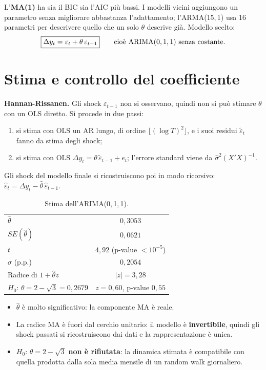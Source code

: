 \documentclass[11pt,a4paper]{article}
\begin{document}
L'\textbf{MA(1)} ha sia il BIC sia l'AIC più bassi. I modelli vicini aggiungono un parametro senza migliorare abbastanza l'adattamento; l'ARMA(15,\,1) usa 16 parametri per descrivere quello che un solo $\theta$ descrive già. Modello scelto:
\[
\boxed{\Delta y_t = \varepsilon_t + \theta\,\varepsilon_{t-1}} \qquad \text{cioè ARIMA(0,\,1,\,1) senza costante.}
\]

\section{Stima e controllo del coefficiente}

\textbf{Hannan-Rissanen.} Gli shock $\varepsilon_{t-1}$ non si osservano, quindi non si può stimare $\theta$ con un OLS diretto. Si procede in due passi:
\begin{enumerate}
\item si stima con OLS un AR lungo, di ordine $\lfloor(\log T)^2\rfloor$, e i suoi residui $\tilde\varepsilon_t$ fanno da stima degli shock;
\item si stima con OLS $\Delta y_t = \theta\,\tilde\varepsilon_{t-1} + e_t$; l'errore standard viene da $\hat\sigma^2(X'X)^{-1}$.
\end{enumerate}
Gli shock del modello finale si ricostruiscono poi in modo ricorsivo: $\hat\varepsilon_t = \Delta y_t - \hat\theta\,\hat\varepsilon_{t-1}$.

\begin{table}[H]
\centering
\begin{tabular}{lc}
\toprule
$\hat\theta$ & $0{,}3053$ \\
$SE(\hat\theta)$ & $0{,}0621$ \\
$t$ & $4{,}92$ \quad (p-value $< 10^{-5}$) \\
$\hat\sigma$ (p.p.) & $0{,}2054$ \\
Radice di $1 + \hat\theta z$ & $|z| = 3{,}28$ \\
\midrule
$H_0$: $\theta = 2 - \sqrt3 = 0{,}2679$ & $z = 0{,}60$, p-value $0{,}55$ \\
\bottomrule
\end{tabular}
\caption{Stima dell'ARIMA(0,\,1,\,1).}
\end{table}

\begin{itemize}
\item $\hat\theta$ è molto significativo: la componente MA è reale.
\item La radice MA è fuori dal cerchio unitario: il modello è \textbf{invertibile}, quindi gli shock passati si ricostruiscono dai dati e la rappresentazione è unica.
\item $H_0$: $\theta = 2-\sqrt3$ \textbf{non è rifiutata}: la dinamica stimata è compatibile con quella prodotta dalla sola media mensile di un random walk giornaliero.
\end{itemize}
\end{document}
